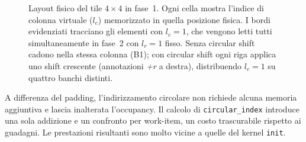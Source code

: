 \begin{figure}[htbp]
{
}
\caption{Layout fisico del tile $4\times4$ in fase~1. Ogni cella mostra l'indice di colonna virtuale ($l_c$) memorizzato in quella posizione fisica. I bordi evidenziati tracciano gli elementi con $l_c{=}1$, che vengono letti tutti simultaneamente in fase~2 con $l_r{=}1$ fisso. Senza circular shift cadono nella stessa colonna (B1); con circular shift ogni riga applica uno shift crescente (annotazioni \textit{+r} a destra), distribuendo $l_c{=}1$ su quattro banchi distinti.}
\label{fig:circular_layout}
\end{figure}

A differenza del padding, l'indirizzamento circolare non richiede alcuna memoria aggiuntiva e lascia inalterata l'occupancy. Il calcolo di \texttt{circular\_index} introduce una sola addizione e un confronto per work-item, un costo trascurabile rispetto ai guadagni. Le prestazioni risultanti sono molto vicine a quelle del kernel \texttt{init}.